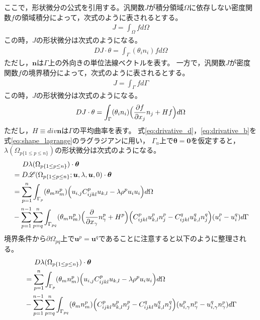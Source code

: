 ここで，形状微分の公式を引用する。汎関数$J$が積分領域$\Omega$に依存しない密度関数$f$の領域積分によって，次式のように表されるとする。
\begin{align}
	J=\int_{\Omega}f d\Omega
	\label{eq:functinal_d}
\end{align}
この時，$J$の形状微分は次式のようになる。
\begin{align}
	DJ\cdot\theta=\int_{\Gamma}(\theta_{i}n_{i})f d\Omega
	\label{eq:drivative_d}
\end{align}
ただし，$\bm{n}$は$\Gamma$上の外向きの単位法線ベクトルを表す。
一方で，汎関数$J$が密度関数$f$の境界積分によって，次式のように表されるとする。
\begin{align}
	J=\int_{\Gamma}f d\Gamma
	\label{eq:functinal_b}
\end{align}
この時，$J$の形状微分は次式のようになる。
\begin{align}
	DJ\cdot\theta=\int_{\Gamma}(\theta_{i}n_{i})\Bigr(\frac{\partial f}{\partial x_{j}}n_{j}+Hf\Bigl) d\Omega
	\label{eq:drivative_b}
\end{align}
ただし，$H\equiv div\bm{n}$は$\Gamma$の平均曲率を表す。
式\eqref{eq:drivative_d}，\eqref{eq:drivative_b}を式\eqref{eq:shape_lagrange}のラグラジアンに用い，
$\Gamma_{u}$上で$\bm{\theta}=\bm{0}$を仮定すると，$\lambda(\Omega_{p\{1\leq p\leq n\}})$の形状微分は次式のようになる。
\begin{align}
	&\hspace{0.5cm}D\lambda(\Omega_{p\{1\leq p\leq n\}})\cdot\bm{\theta}
	\nonumber
	\\
	&=D\mathscr{L}(\Omega_{p\{1\leq p\leq n\}};\bm{u},\lambda,\bm{u},0)\cdot\bm{\theta}
	\nonumber
	\\
	&=\sum_{p=1}^{n}\int_{\Gamma_p}(\theta_{m}n_{m}^{p})\Bigr(u_{i,j}C_{ijkl}^{p}u_{k,l}-\lambda\rho^{p}u_{i}u_{i}\Bigl) d\Omega
	\nonumber
	\\
	&-\sum_{p=1}^{n-1}\sum_{p=q}^{n}\int_{\Gamma_{pq}}(\theta_{m}n_{m}^{p})
	\Bigr(\frac{\partial}{\partial x_\gamma }n_\gamma^{p} +H^{p}\Bigl)
	\Bigr(C_{ijkl}^{p}u_{k,l}^{p}n_{j}^{p}-C_{ijkl}^{q}u_{k,l}^{q}n_{j}^{q}\Bigl)
	(u_{i}^{p}-u_{i}^{q}) d\Gamma
	\label{eq:shape_lambda}
\end{align}
境界条件から$\partial \Omega_{pq}$上で$\bm{u}^{p}=\bm{u}^{q}$であることに注意すると以下のように整理される。
\begin{align}
	&\hspace{0.5cm}D\lambda(\Omega_{p\{1\leq p\leq n\}})\cdot\bm{\theta}
	\nonumber
	\\
	&=\sum_{p=1}^{n}\int_{\Gamma_p}(\theta_{m}n_{m}^{p})\Bigr(u_{i,j}C_{ijkl}^{p}u_{k,l}-\lambda\rho^{p}u_{i}u_{i}\Bigl) d\Omega
	\nonumber
	\\
	&-\sum_{p=1}^{n-1}\sum_{p=q}^{n}\int_{\Gamma_{pq}}(\theta_{m}n_{m}^{p})
	\Bigr(C_{ijkl}^{p}u_{k,l}^{p}n_{j}^{p}-C_{ijkl}^{q}u_{k,l}^{q}n_{j}^{q}\Bigl)
	(u_{i,\gamma}^{p}n_\gamma^{p}-u_{i,\gamma}^{q}n_\gamma^{p}) d\Gamma
	\label{eq:shape_lambda}
\end{align}
